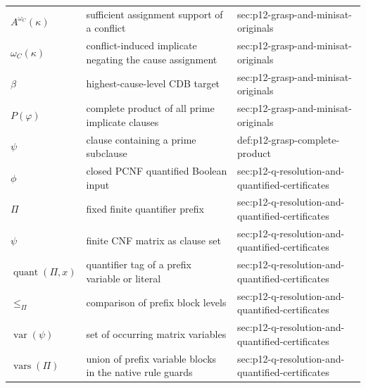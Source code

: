 \begin{longtable}{@{}p{}p{}p{}@{}}
\(A^{\omega_C}(\kappa)\) & sufficient assignment support of a conflict & sec:\allowbreak{}p12-\allowbreak{}grasp-\allowbreak{}and-\allowbreak{}minisat-\allowbreak{}originals \\
\(\omega_C(\kappa)\) & conflict-induced implicate negating the cause assignment & sec:\allowbreak{}p12-\allowbreak{}grasp-\allowbreak{}and-\allowbreak{}minisat-\allowbreak{}originals \\
\(\beta\) & highest-cause-level CDB target & sec:\allowbreak{}p12-\allowbreak{}grasp-\allowbreak{}and-\allowbreak{}minisat-\allowbreak{}originals \\
\(P(\varphi)\) & complete product of all prime implicate clauses & sec:\allowbreak{}p12-\allowbreak{}grasp-\allowbreak{}and-\allowbreak{}minisat-\allowbreak{}originals \\
\(\psi\) & clause containing a prime subclause & def:\allowbreak{}p12-\allowbreak{}grasp-\allowbreak{}complete-\allowbreak{}product \\
\(\phi\) & closed PCNF quantified Boolean input & sec:\allowbreak{}p12-\allowbreak{}q-\allowbreak{}resolution-\allowbreak{}and-\allowbreak{}quantified-\allowbreak{}certificates \\
\(\Pi\) & fixed finite quantifier prefix & sec:\allowbreak{}p12-\allowbreak{}q-\allowbreak{}resolution-\allowbreak{}and-\allowbreak{}quantified-\allowbreak{}certificates \\
\(\psi\) & finite CNF matrix as clause set & sec:\allowbreak{}p12-\allowbreak{}q-\allowbreak{}resolution-\allowbreak{}and-\allowbreak{}quantified-\allowbreak{}certificates \\
\(\operatorname{quant}(\Pi,\allowbreak x)\) & quantifier tag of a prefix variable or literal & sec:\allowbreak{}p12-\allowbreak{}q-\allowbreak{}resolution-\allowbreak{}and-\allowbreak{}quantified-\allowbreak{}certificates \\
\(\leq_\Pi\) & comparison of prefix block levels & sec:\allowbreak{}p12-\allowbreak{}q-\allowbreak{}resolution-\allowbreak{}and-\allowbreak{}quantified-\allowbreak{}certificates \\
\(\operatorname{var}(\psi)\) & set of occurring matrix variables & sec:\allowbreak{}p12-\allowbreak{}q-\allowbreak{}resolution-\allowbreak{}and-\allowbreak{}quantified-\allowbreak{}certificates \\
\(\operatorname{vars}(\Pi)\) & union of prefix variable blocks in the native rule guards & sec:\allowbreak{}p12-\allowbreak{}q-\allowbreak{}resolution-\allowbreak{}and-\allowbreak{}quantified-\allowbreak{}certificates \\

\end{longtable}
